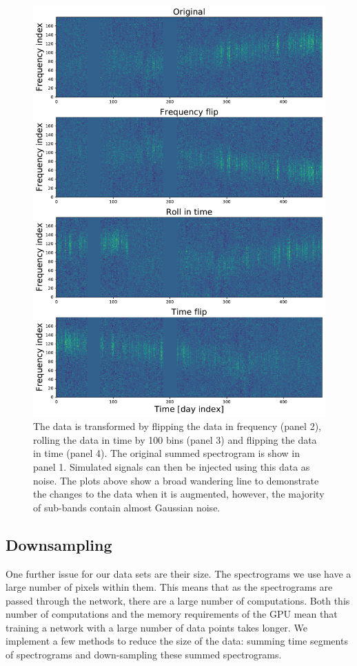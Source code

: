 \begin{figure}
	\centering
	\includegraphics[width=0.7\columnwidth]{C4_cnn/augmentation.pdf}
	\caption{The data is transformed by flipping the data in frequency (panel 2), rolling the data in time by 100 bins (panel 3) and flipping the data in time (panel 4). The original summed spectrogram is show in panel 1. Simulated signals can then be injected using this data as noise. The plots above show a broad wandering line to demonstrate the changes to the data when it is augmented, however, the majority of sub-bands contain almost Gaussian noise. }
	\label{machine:data:augmentation:examples}
\end{figure}

\subsection{\label{machine:data:downsample} Downsampling}

%
One further issue for our data sets are their size. The spectrograms we use have a large number of pixels within them.
This means that as the spectrograms are passed through the network, there are a large number of computations.
Both this number of computations and the memory requirements of the GPU mean that training a network with a large number of data points takes longer.
We implement a few methods to reduce the size of the data: summing time segments of
spectrograms and down-sampling these summed spectrograms.  


